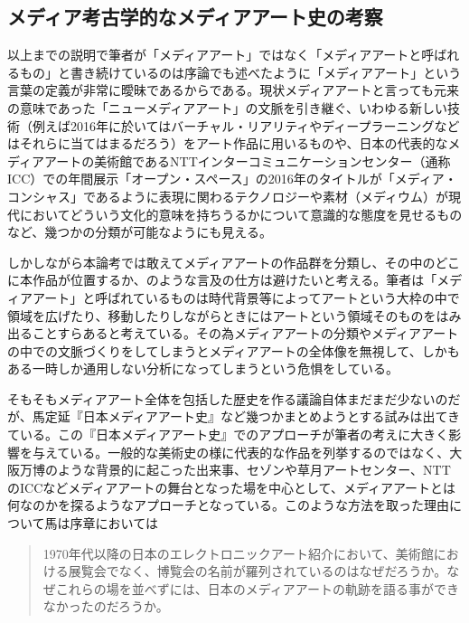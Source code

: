 \documentclass[a4paper,report]{jsbook}
\begin{document}
\subsection{メディア考古学的なメディアアート史の考察}\label{ux30e1ux30c7ux30a3ux30a2ux8003ux53e4ux5b66ux7684ux306aux30e1ux30c7ux30a3ux30a2ux30a2ux30fcux30c8ux53f2ux306eux8003ux5bdf}

以上までの説明で筆者が「メディアアート」ではなく「メディアアートと呼ばれるもの」と書き続けているのは序論でも述べたように「メディアアート」という言葉の定義が非常に曖昧であるからである。現状メディアアートと言っても元来の意味であった「ニューメディアアート」の文脈を引き継ぐ、いわゆる新しい技術（例えば2016年に於いてはバーチャル・リアリティやディープラーニングなどはそれらに当てはまるだろう）をアート作品に用いるものや、日本の代表的なメディアアートの美術館であるNTTインターコミュニケーションセンター（通称ICC）での年間展示「オープン・スペース」の2016年のタイトルが「メディア・コンシャス」であるように表現に関わるテクノロジーや素材（メディウム）が現代においてどういう文化的意味を持ちうるかについて意識的な態度を見せるものなど、幾つかの分類が可能なようにも見える。

しかしながら本論考では敢えてメディアアートの作品群を分類し、その中のどこに本作品が位置するか、のような言及の仕方は避けたいと考える。筆者は「メディアアート」と呼ばれているものは時代背景等によってアートという大枠の中で領域を広げたり、移動したりしながらときにはアートという領域そのものをはみ出ることすらあると考えている。その為メディアアートの分類やメディアアートの中での文脈づくりをしてしまうとメディアアートの全体像を無視して、しかもある一時しか通用しない分析になってしまうという危惧をしている。

そもそもメディアアート全体を包括した歴史を作る議論自体まだまだ少ないのだが、馬定延『日本メディアアート史』など幾つかまとめようとする試みは出てきている。この『日本メディアアート史』でのアプローチが筆者の考えに大きく影響を与えている。一般的な美術史の様に代表的な作品を列挙するのではなく、大阪万博のような背景的に起こった出来事、セゾンや草月アートセンター、NTTのICCなどメディアアートの舞台となった場を中心として、メディアアートとは何なのかを探るようなアプローチとなっている。このような方法を取った理由について馬は序章においては

\begin{quote}
1970年代以降の日本のエレクトロニックアート紹介において、美術館における展覧会でなく、博覧会の名前が羅列されているのはなぜだろうか。なぜこれらの場を並べずには、日本のメディアアートの軌跡を語る事ができなかったのだろうか。
\end{quote}
\end{document}
